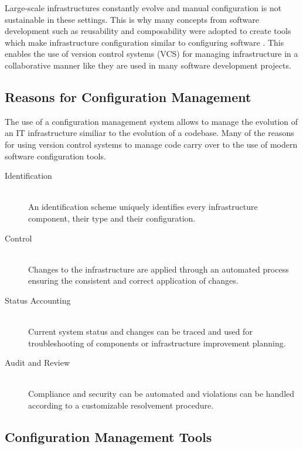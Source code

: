 Large-scale infrastructures constantly evolve and manual configuration is not sustainable in these settings. This is why many concepts from software development such as reusability and composability were adopted to create tools which make infrastructure configuration similar to configuring software \cite{kanies2006puppet}. This enables the use of version control systems (VCS) for managing infrastructure in a collaborative manner like they are used in many software development projects.

\subsection{Reasons for Configuration Management}

The use of a configuration management system allows to manage the evolution of an IT infrastructure similiar to the evolution of a codebase. Many of the reasons for using version control systems to manage code \cite{Dart:1991:CCM:111062.111063}\cite{1983ansi} carry over to the use of modern software configuration tools.

\begin{description}

\item[Identification] \hfill \\ 
An identification scheme uniquely identifies every infrastructure component, their type and their configuration. 

\item[Control] \hfill \\
Changes to the infrastructure are applied through an automated process
ensuring the consistent and correct application of changes.

\item[Status Accounting]  \hfill \\
Current system status and changes can be traced and used for troubleshooting of components or infrastructure improvement planning.

\item[Audit and Review] \hfill \\
Compliance and security can be automated and violations can be handled according to a customizable resolvement procedure.  

\end{description}

\subsection{Configuration Management Tools}

